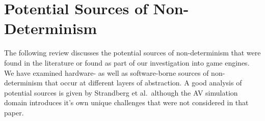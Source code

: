 \documentclass[letterpaper, 10 pt, journal, twoside]{IEEEtran}
\providecommand{\DIFaddtex}[1]{{\protect\color{blue}\uwave{#1}}} %
\providecommand{\DIFaddbegin}{} %
\providecommand{\DIFaddend}{} %
\providecommand{\DIFadd}[1]{\texorpdfstring{\DIFaddtex{#1}}{#1}} %
\begin{document}
\section{Potential Sources of Non-Determinism} \label{s:nondeterminisimSources}

The following review discusses the potential sources of non-determinism that were found in the literature or found as part of our investigation into game engines. We have examined hardware- as well as software-borne sources of non-determinism that occur at different layers of abstraction. 
%
%
%
A good analysis of potential sources is given by Strandberg et al.~\cite{intermittently-failing-tests}\DIFaddbegin \DIFadd{, }\DIFaddend although the AV simulation domain introduces it's own unique challenges that were not considered in that paper.



\medskip

\end{document}
